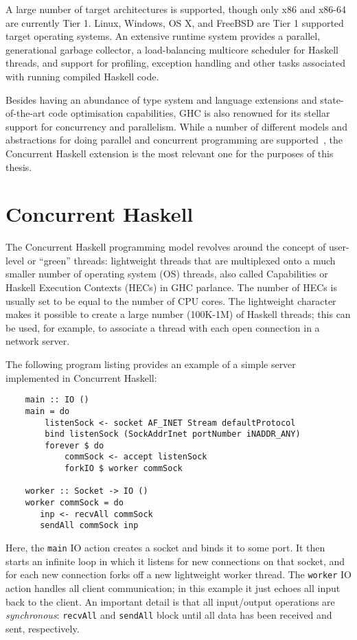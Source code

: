 \documentclass[a4paper,11pt,oneside]{report}
\begin{document}
A large number of target architectures is supported, though only x86 and x86-64
are currently Tier 1. Linux, Windows, OS X, and FreeBSD are Tier 1 supported
target operating systems. An extensive runtime system provides a parallel,
generational garbage collector, a load-balancing multicore scheduler for Haskell
threads, and support for profiling, exception handling and other tasks
associated with running compiled Haskell code.

Besides having an abundance of type system and language extensions and
state-of-the-art code optimisation capabilities, GHC is also renowned for its
stellar support for concurrency and parallelism. While a number of different
models and abstractions for doing parallel and concurrent programming are
supported~\cite{bib:marlow2013}, the Concurrent Haskell extension is the most
relevant one for the purposes of this thesis.

\section{Concurrent Haskell}

The Concurrent Haskell programming model revolves around the concept of
user-level or ``green'' threads: lightweight threads that are multiplexed onto a
much smaller number of operating system (OS) threads, also called Capabilities
or Haskell Execution Contexts (HECs) in GHC parlance. The number of HECs is
usually set to be equal to the number of CPU cores. The lightweight character
makes it possible to create a large number (100K-1M) of Haskell threads; this
can be used, for example, to associate a thread with each open connection in a
network server.

The following program listing provides an example of a simple server implemented
in Concurrent Haskell:

\begin{verbatim}
    main :: IO ()
    main = do
        listenSock <- socket AF_INET Stream defaultProtocol
        bind listenSock (SockAddrInet portNumber iNADDR_ANY)
        forever $ do
            commSock <- accept listenSock
            forkIO $ worker commSock

    worker :: Socket -> IO ()
    worker commSock = do
       inp <- recvAll commSock
       sendAll commSock inp

\end{verbatim}

Here, the \texttt{main} IO action creates a socket and binds it to some port. It
then starts an infinite loop in which it listens for new connections on that
socket, and for each new connection forks off a new lightweight worker
thread. The \texttt{worker} IO action handles all client communication; in this
example it just echoes all input back to the client. An important detail is that
all input/output operations are \textit{synchronous}: \texttt{recvAll} and
\texttt{sendAll} block until all data has been received and sent, respectively.
\end{document}
